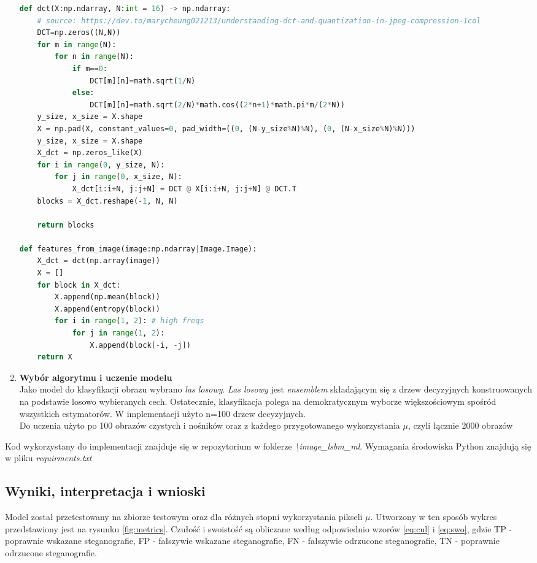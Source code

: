 \begin{enumerate}
            \begin{lstlisting}[language=Python, caption={Funkcja wykonujące transformację \textit{DCT} oraz oraz funkcja do ekstrakcji cech z pozyskanych w tenb sposób bloków}]
def dct(X:np.ndarray, N:int = 16) -> np.ndarray:
    # source: https://dev.to/marycheung021213/understanding-dct-and-quantization-in-jpeg-compression-1col
    DCT=np.zeros((N,N))
    for m in range(N):
        for n in range(N):
            if m==0:
                DCT[m][n]=math.sqrt(1/N)
            else:
                DCT[m][n]=math.sqrt(2/N)*math.cos((2*n+1)*math.pi*m/(2*N))
    y_size, x_size = X.shape
    X = np.pad(X, constant_values=0, pad_width=((0, (N-y_size%N)%N), (0, (N-x_size%N)%N)))
    y_size, x_size = X.shape
    X_dct = np.zeros_like(X)
    for i in range(0, y_size, N):
        for j in range(0, x_size, N):
            X_dct[i:i+N, j:j+N] = DCT @ X[i:i+N, j:j+N] @ DCT.T
    blocks = X_dct.reshape(-1, N, N)

    return blocks

def features_from_image(image:np.ndarray|Image.Image):
    X_dct = dct(np.array(image))
    X = []
    for block in X_dct:
        X.append(np.mean(block))
        X.append(entropy(block))
        for i in range(1, 2): # high freqs
            for j in range(1, 2):
                X.append(block[-i, -j])
    return X                
            \end{lstlisting}
            
            \item \textbf{Wybór algorytmu i uczenie modelu}\\
            Jako model do klasyfikacji obrazu wybrano \textit{las losowy}. \textit{Las losowy} jest \textit{ensemblem} składającym się z drzew decyzyjnych konstruowanych na podstawie losowo wybieranych cech. Ostatecznie, klasyfikacja polega na demokratycznym wyborze większościowym spośród wszystkich estymatorów. W implementacji użyto n=100 drzew decyzyjnych.\cite{random_forest}\\
            Do uczenia użyto po 100 obrazów czystych i nośników oraz z każdego przygotowanego wykorzystania $\mu$, czyli łącznie 2000 obrazów
        \end{enumerate}
        Kod wykorzystany do implementacji znajduje się w repozytorium w folderze \textit{\textbackslash image\_lsbm\_ml}. Wymagania środowiska Python znajdują się w pliku \textit{requirments.txt}
        
    \subsection{Wyniki, interpretacja i wnioski}
    Model został przetestowany na zbiorze testowym oraz dla różnych stopni wykorzystania pikseli $\mu$. Utworzony w ten sposób wykres przedstawiony jest na rysunku \ref{fig:metrics}. Czułość i swoistość są obliczane według odpowiednio wzorów \ref{eq:cul} i \ref{eq:swo}, gdzie TP - poprawnie wskazane steganografie, FP - fałszywie wskazane steganografie, FN - fałszywie odrzucone steganografie, TN - poprawnie odrzucone steganografie.

